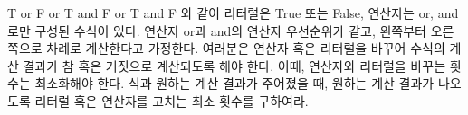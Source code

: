 T or F or T and F or T and F
와 같이 리터럴은 True 또는 False, 연산자는 or, and로만 구성된 수식이 있다. 연산자 or과 and의 연산자 우선순위가 같고, 왼쪽부터 오른쪽으로 차례로 계산한다고 가정한다. 여러분은 연산자 혹은 리터럴을 바꾸어 수식의 계산 결과가 참 혹은 거짓으로 계산되도록 해야 한다. 이때, 연산자와 리터럴을 바꾸는 횟수는 최소화해야 한다. 식과 원하는 계산 결과가 주어졌을 때, 원하는 계산 결과가 나오도록 리터럴 혹은 연산자를 고치는 최소 횟수를 구하여라.
